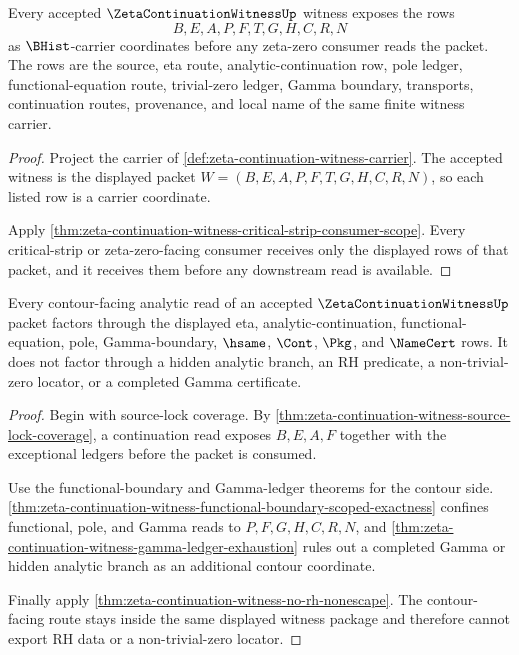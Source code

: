 \begin{theorem}
\label{thm:zeta-continuation-witness-carrier-row}
Every accepted $\ZetaContinuationWitnessUp$ witness exposes the rows
$$
B,E,A,P,F,T,G,H,C,R,N
$$
as $\BHist$-carrier coordinates before any zeta-zero consumer reads the packet. The rows are the source, eta route, analytic-continuation row, pole ledger, functional-equation route, trivial-zero ledger, Gamma boundary, transports, continuation routes, provenance, and local name of the same finite witness carrier.
\end{theorem}
\begin{proof}
Project the carrier of \autoref{def:zeta-continuation-witness-carrier}. The accepted witness is the displayed packet $W=(B,E,A,P,F,T,G,H,C,R,N)$, so each listed row is a carrier coordinate.

Apply \autoref{thm:zeta-continuation-witness-critical-strip-consumer-scope}. Every critical-strip or zeta-zero-facing consumer receives only the displayed rows of that packet, and it receives them before any downstream read is available.
\end{proof}

\begin{theorem}
\label{thm:zeta-continuation-witness-contour-route}
Every contour-facing analytic read of an accepted $\ZetaContinuationWitnessUp$ packet factors through the displayed eta, analytic-continuation, functional-equation, pole, Gamma-boundary, $\hsame$, $\Cont$, $\Pkg$, and $\NameCert$ rows. It does not factor through a hidden analytic branch, an RH predicate, a non-trivial-zero locator, or a completed Gamma certificate.
\end{theorem}
\begin{proof}
Begin with source-lock coverage. By \autoref{thm:zeta-continuation-witness-source-lock-coverage}, a continuation read exposes $B,E,A,F$ together with the exceptional ledgers before the packet is consumed.

Use the functional-boundary and Gamma-ledger theorems for the contour side. \autoref{thm:zeta-continuation-witness-functional-boundary-scoped-exactness} confines functional, pole, and Gamma reads to $P,F,G,H,C,R,N$, and \autoref{thm:zeta-continuation-witness-gamma-ledger-exhaustion} rules out a completed Gamma or hidden analytic branch as an additional contour coordinate.

Finally apply \autoref{thm:zeta-continuation-witness-no-rh-nonescape}. The contour-facing route stays inside the same displayed witness package and therefore cannot export RH data or a non-trivial-zero locator.
\end{proof}

